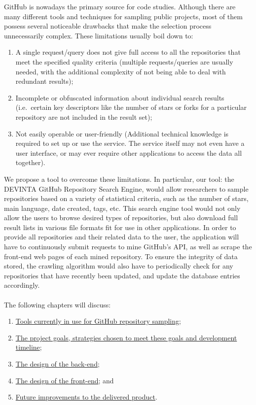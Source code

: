GitHub is nowadays the primary source for code studies.
Although there are many different tools and techniques for sampling public projects, most of them possess several noticeable drawbacks that make the selection process unnecessarily complex.
These limitations usually boil down to:
\begin{enumerate}
    \item A single request/query does not give full access to all the repositories that meet the specified quality criteria (multiple requests/queries are usually needed, with the additional complexity of not being able to deal with redundant results);
    \item Incomplete or obfuscated information about individual search results (i.e.\ certain key descriptors like the number of stars or forks for a particular repository are not included in the result set);
    \item Not easily operable or user-friendly (Additional technical knowledge is required to set up or use the service. The service itself may not even have a user interface, or may ever require other applications to access the data all together).
\end{enumerate}

\newpage

We propose a tool to overcome these limitations.
In particular, our tool: the DEVINTA GitHub Repository Search Engine, would allow researchers to sample repositories based on a variety of statistical criteria, such as the number of stars, main language, date created, tags, etc.
This search engine tool would not only allow the users to browse desired types of repositories, but also download full result lists in various file formats fit for use in other applications.
In order to provide all repositories and their related data to the user, the application will have to continuously submit requests to mine GitHub's API, as well as scrape the front-end web pages of each mined repository.
To ensure the integrity of data stored, the crawling algorithm would also have to periodically check for any repositories that have recently been updated, and update the database entries accordingly.
\\\\
\noindent
The following chapters will discuss:
\begin{enumerate}
    \item \hyperref[ch:2]{Tools currently in use for GitHub repository sampling};
    \item \hyperref[ch:3]{The project goals, strategies chosen to meet these goals and development timeline};
    \item \hyperref[ch:4]{The design of the back-end};
    \item \hyperref[ch:5]{The design of the front-end}; and
    \item \hyperref[ch:6]{Future improvements to the delivered product}.
\end{enumerate}